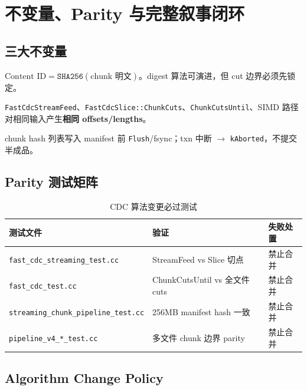 \chapter{不变量、Parity 与完整叙事闭环}\label{ch:parity}

\section{三大不变量}

\begin{invariantbox}[I-B1：Content ID]
$\text{Content ID} = \texttt{SHA256}(\text{chunk 明文})$。digest 算法可演进，但 cut 边界必须先锁定。
\end{invariantbox}

\begin{invariantbox}
\texttt{FastCdcStreamFeed}、\texttt{FastCdcSlice::ChunkCuts}、\texttt{ChunkCutsUntil}、SIMD 路径对相同输入产生\textbf{相同 offsets/lengths}。
\end{invariantbox}

\begin{invariantbox}
chunk hash 列表写入 manifest 前 \texttt{Flush}/fsync；txn 中断 $\rightarrow$ \texttt{kAborted}，不提交半成品。
\end{invariantbox}

\section{Parity 测试矩阵}

\begin{table}[htbp]
\centering
\caption{CDC 算法变更必过测试}
\label{tab:parity-tests}
\small
\begin{tabular}{@{}L{4.8cm}L{3.8cm}L{5.2cm}@{}}
\toprule
测试文件 & 验证 & 失败处置 \\
\midrule
\texttt{fast\_cdc\_streaming\_test.cc} & StreamFeed vs Slice 切点 & 禁止合并 \\
\texttt{fast\_cdc\_test.cc} & ChunkCutsUntil vs 全文件 cuts & 禁止合并 \\
\texttt{streaming\_chunk\_pipeline\_test.cc} & 256MB manifest hash 一致 & 禁止合并 \\
\texttt{pipeline\_v4\_*\_test.cc} & 多文件 chunk 边界 parity & 禁止合并 \\
\bottomrule
\end{tabular}
\end{table}

\section{Algorithm Change Policy}

